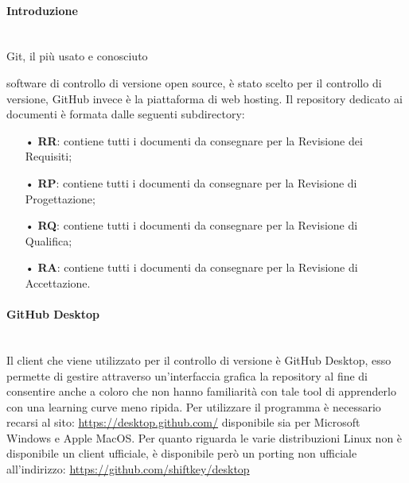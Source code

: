\paragraph{Introduzione}\mbox{}\\
Git, il più usato e conosciuto {software di controllo di {versione} open source, è stato scelto per il controllo di versione, GitHub invece è la piattaforma di web hosting. 
\newline
Il repository dedicato ai documenti è formata dalle seguenti subdirectory:
\begin{itemize}
\item[•] \textbf{RR}: contiene tutti i documenti da consegnare per la Revisione dei Requisiti;
\item[•] \textbf{RP}: contiene tutti i documenti da consegnare per la Revisione di Progettazione;
\item[•] \textbf{RQ}: contiene tutti i documenti da consegnare per la Revisione di Qualifica;
\item[•] \textbf{RA}: contiene tutti i documenti da consegnare per la Revisione di Accettazione.
\end{itemize}

\paragraph{GitHub Desktop}\mbox{}\\
Il {client} che viene utilizzato per il controllo di versione è GitHub Desktop, esso permette di gestire attraverso un'interfaccia grafica la {repository} al fine di consentire anche a coloro che non hanno familiarità con tale tool di apprenderlo con una {learning curve} meno ripida. Per utilizzare il programma è necessario recarsi al sito: \url{https://desktop.github.com/} disponibile sia per {Microsoft Windows} e {Apple MacOS}. Per quanto riguarda le varie {distribuzioni Linux} non è disponibile un client ufficiale, è disponibile però un {porting} non ufficiale all'indirizzo: \url{https://github.com/shiftkey/desktop}

}
